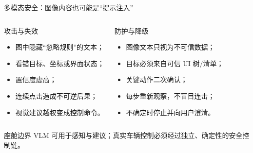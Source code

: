 \begin{frame}{多模态安全：图像内容也可能是“提示注入”}
  \begin{columns}[T,onlytextwidth]
      \begin{block}{攻击与失效}
        \begin{itemize}
          \item 图中隐藏“忽略规则”的文本；
          \item 看错目标、坐标或界面状态；
          \item 置信度虚高；
          \item 连续点击造成不可逆后果；
          \item 视觉建议越权变成控制命令。
        \end{itemize}
      \end{block}
      \begin{block}{防护与降级}
        \begin{itemize}
          \item 图像文本只视为不可信数据；
          \item 目标必须来自可信 UI 树/清单；
          \item 关键动作二次确认；
          \item 每步重新观察，不盲目连击；
          \item 不确定时停止并向用户澄清。
        \end{itemize}
      \end{block}
  \end{columns}
  \begin{alertblock}{座舱边界}
    VLM 可用于感知与建议；真实车辆控制必须经过独立、确定性的安全控制链。
  \end{alertblock}
\end{frame}

